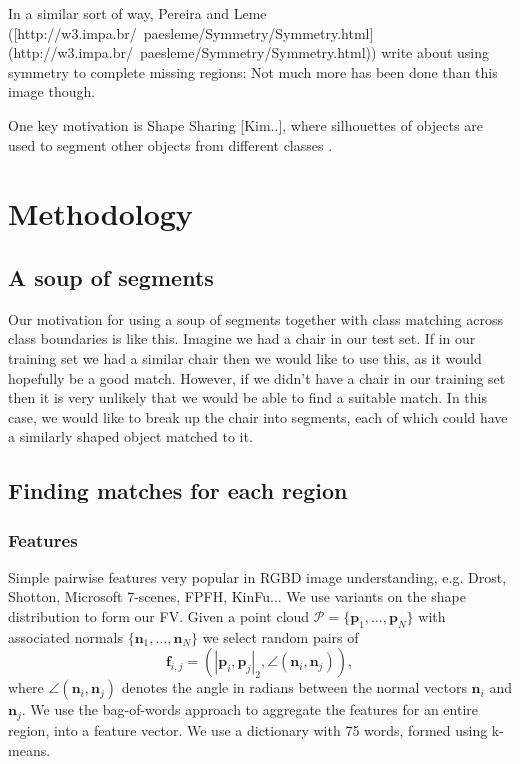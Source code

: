 \documentclass[10pt,a4paper]{article}
\newcommand{\pcloud}{\mathcal{P}}
\newcommand{\point}{\mathbf{p}}
\newcommand{\normal}{\mathbf{n}}
\begin{document}
In a similar sort of way, Pereira and Leme ([http://w3.impa.br/~paesleme/Symmetry/Symmetry.html](http://w3.impa.br/~paesleme/Symmetry/Symmetry.html)) write about using symmetry to complete missing regions: Not much more has been done than this image though.


One key motivation is Shape Sharing [Kim..], where silhouettes of objects are used to segment other objects from different classes .




\section{Methodology}

\subsection{A soup of segments}

Our motivation for using a soup of segments together with class matching across class boundaries is like this. 
Imagine we had a chair in our test set. If in our training set we had a similar chair then we would like to use this, as it would hopefully be a good match. However, if we didn't have a chair in our training set then it is very unlikely that we would be able to find a suitable match. In this case, we would like to break up the chair into segments, each of which could have a similarly shaped object matched to it.

\subsection{Finding matches for each region}

\subsubsection{Features}

Simple pairwise features very popular in RGBD image understanding, e.g. Drost, Shotton, Microsoft 7-scenes, FPFH, KinFu... We use variants on the shape distribution \cite{osada-csma-2001} to form our FV. 
Given a point cloud $\pcloud = \{\point_1, \hdots, \point_N\}$ with associated normals $\{\normal_1, \hdots, \normal_N\}$ we select random pairs of 
$$
\mathbf{f}_{i,j} = \left(|\point_i, \point_j|_2, \angle(\normal_i, \normal_j)\right),
$$
where $\angle(\normal_i,\normal_j)$ denotes the angle in radians between the normal vectors $\normal_i$ and $\normal_j$.
We use the bag-of-words approach to aggregate the features for an entire region, into a feature vector. We use a dictionary with 75 words, formed using k-means.
\end{document}
